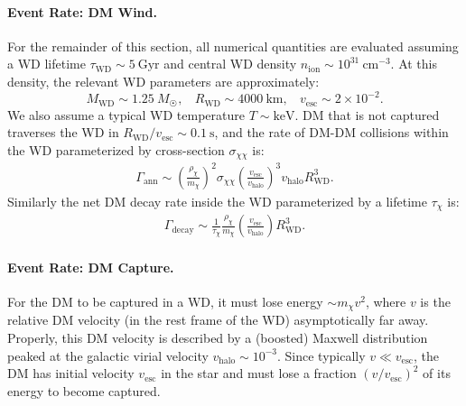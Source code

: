 \documentclass[preprintnumbers,amsmath,amssymb,prd,superscriptaddress]{revtex4}
\newcommand{\cm}{\text{cm}}
\def\r{\right)}
\def\l{\left(}
\begin{document}
\paragraph{Event Rate: DM Wind.}
For the remainder of this section, all numerical quantities are evaluated assuming a WD lifetime $\tau_\text{WD} \sim 5 ~\text{Gyr}$ and central WD density $n_\text{ion} \sim 10^{31} ~\cm^{-3}$. 
At this density, the relevant WD parameters are approximately: 
\begin{equation}
M_\text{WD} \sim 1.25 ~M_{\astrosun}, ~~~~ R_\text{WD} \sim 4000 ~\text{km}, ~~~~ v_\text{esc} \sim 2 \times 10^{-2}. 
\end{equation}
We also assume a typical WD temperature $T \sim \text{keV}$.
DM that is not captured traverses the WD in $R_\text{WD}/v_\text{esc} \sim 0.1 ~\text{s}$, and the rate of DM-DM collisions within the WD parameterized by cross-section $\sigma_{\chi \chi}$ is:
\begin{align}
  \Gamma_\text{ann}
  \sim \l \frac{\rho_\chi}{m_\chi} \r^2 \sigma_{\chi \chi} \l \frac{v_\text{esc}}{v_\text{halo}}\r^3 v_\text{halo} R_\text{WD}^3. 
  \label{eq:collisionDM}
\end{align}
Similarly the net DM decay rate inside the WD parameterized by a lifetime $\tau_\chi$ is:
\begin{align}
 \Gamma_\text{decay}
   \sim \frac{1}{\tau_\chi} \frac{\rho_{\chi}}{m_\chi} \l \frac{v_\text{esc}}{v_\text{halo}}\r R_\text{WD}^3.
  \label{eq:decayDM}
\end{align}

\paragraph{Event Rate: DM Capture.}
For the DM to be captured in a WD, it must lose energy $\sim m_\chi v^2$, where $v$ is the relative DM velocity (in the rest frame of the WD) asymptotically far away.
Properly, this DM velocity is described by a (boosted) Maxwell distribution peaked at the galactic virial velocity $v_\text{halo} \sim 10^{-3}$. 
Since typically $v \ll v_\text{esc}$, the DM has initial velocity $v_\text{esc}$ in the star and must lose a fraction $(v/v_\text{esc})^2$ of its energy to become captured. 
\end{document}

